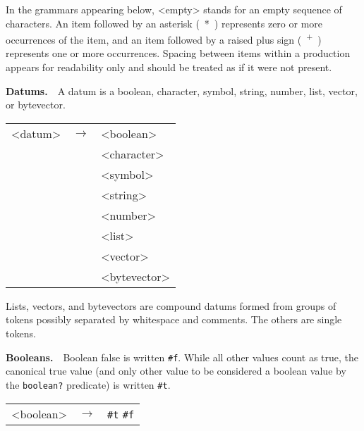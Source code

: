 In the grammars appearing below, \textless{}empty\textgreater{} stands for an
empty sequence of characters.
An item followed by an asterisk ( * ) represents zero or more
occurrences of the item, and an item followed by a raised plus sign
( \textsuperscript{+} ) represents one or more occurrences.
Spacing between items within a production appears for readability only and
should be treated as if it were not present.


\textbf{Datums\label{grammar_grammar_datums}.}  \label{grammar_s13}A datum is a boolean, character, symbol, string, number, list, vector,
or bytevector.


  
  
  {\footnotesize
\begin{tabular}[H]{lcl}

\textless{}datum\textgreater{} & \(\longrightarrow\) & \textless{}boolean\textgreater{} \\

     & \textbar{} & \textless{}character\textgreater{} \\

     & \textbar{} & \textless{}symbol\textgreater{} \\

     & \textbar{} & \textless{}string\textgreater{} \\

     & \textbar{} & \textless{}number\textgreater{} \\

     & \textbar{} & \textless{}list\textgreater{} \\

     & \textbar{} & \textless{}vector\textgreater{} \\

     & \textbar{} & \textless{}bytevector\textgreater{}
 \\
\end{tabular}
}


Lists, vectors, and bytevectors are compound datums formed from groups of
tokens possibly separated by whitespace and comments.
The others are single tokens.


\textbf{Booleans\label{grammar_grammar_booleans}.}  \label{grammar_s14}Boolean false is written \texttt{\#{}f}.
While all other values count as true, the canonical true value (and only
other value to be considered a boolean value by the \texttt{boolean?}
predicate) is written \texttt{\#{}t}.


  
  
  {\footnotesize
\begin{tabular}[H]{lcl}

\textless{}boolean\textgreater{} & \(\longrightarrow\) & \texttt{\#{}t} \textbar{} \texttt{\#{}f}
 \\
\end{tabular}
}


